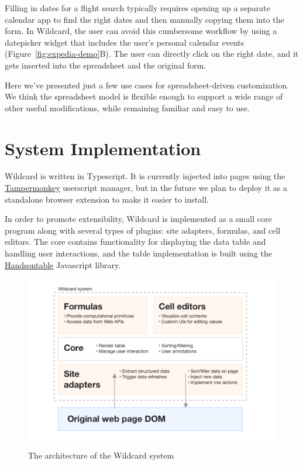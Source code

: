 \documentclass[english,submission]{programming}
\begin{document}
Filling in dates for a flight search typically requires opening up a
separate calendar app to find the right dates and then manually copying
them into the form. In Wildcard, the user can avoid this cumbersome
workflow by using a datepicker widget that includes the user's personal
calendar events{ (Figure~\ref{fig:expedia-demo}B)}. The user can
directly click on the right date, and it gets inserted into the
spreadsheet and the original form.

Here we've presented just a few use cases for spreadsheet-driven
customization. We think the spreadsheet model is flexible enough to
support a wide range of other useful modifications, while remaining
familiar and easy to use.

\hypertarget{sec:implementation}{%
\section{System Implementation}\label{sec:implementation}}

Wildcard is written in Typescript. It is currently injected into pages
using the \href{https://www.tampermonkey.net/}{Tampermonkey} userscript
manager, but in the future we plan to deploy it as a standalone browser
extension to make it easier to install.

In order to promote extensibility, Wildcard is implemented as a small
core program along with several types of plugins: site adapters,
formulas, and cell editors. The core contains functionality for
displaying the data table and handling user interactions, and the table
implementation is built using the
\href{https://handsontable.com/}{Handsontable} Javascript library.

\begin{figure}
\hypertarget{fig:architecture}{%
\centering
\includegraphics{media/architecture-clean.png}
\caption{The architecture of the Wildcard
system}\label{fig:architecture}
}
\end{figure}
\end{document}
